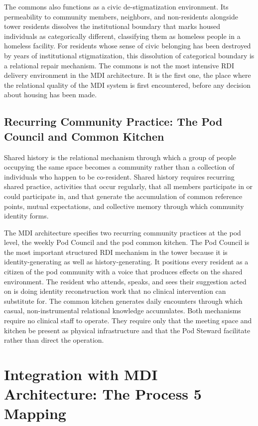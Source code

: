 \documentclass[12pt, letterpaper]{article}
\begin{document}
The commons also functions as a civic de-stigmatization environment. Its permeability to community members, neighbors, and non-residents alongside tower residents dissolves the institutional boundary that marks housed individuals as categorically different, classifying them as homeless people in a homeless facility. For residents whose sense of civic belonging has been destroyed by years of institutional stigmatization, this dissolution of categorical boundary is a relational repair mechanism. The commons is not the most intensive RDI delivery environment in the MDI architecture. It is the first one, the place where the relational quality of the MDI system is first encountered, before any decision about housing has been made.

\subsection{Recurring Community Practice: The Pod Council and Common Kitchen}

Shared history is the relational mechanism through which a group of people occupying the same space becomes a community rather than a collection of individuals who happen to be co-resident. Shared history requires recurring shared practice, activities that occur regularly, that all members participate in or could participate in, and that generate the accumulation of common reference points, mutual expectations, and collective memory through which community identity forms.

The MDI architecture specifies two recurring community practices at the pod level, the weekly Pod Council and the pod common kitchen. The Pod Council is the most important structured RDI mechanism in the tower because it is identity-generating as well as history-generating. It positions every resident as a citizen of the pod community with a voice that produces effects on the shared environment. The resident who attends, speaks, and sees their suggestion acted on is doing identity reconstruction work that no clinical intervention can substitute for. The common kitchen generates daily encounters through which casual, non-instrumental relational knowledge accumulates. Both mechanisms require no clinical staff to operate. They require only that the meeting space and kitchen be present as physical infrastructure and that the Pod Steward facilitate rather than direct the operation.


\clearpage
\section{Integration with MDI Architecture: The Process 5 Mapping}
\end{document}

